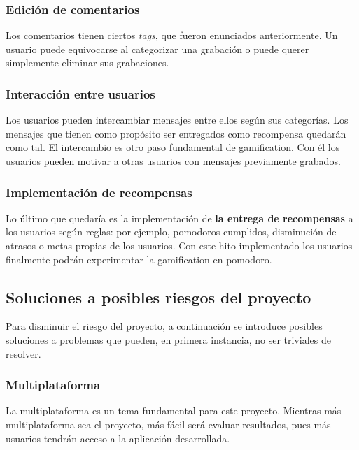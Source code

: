 \documentclass[12pt,letterpaper]{report}
\begin{document}
\subsubsection{Edición de comentarios}

Los comentarios tienen ciertos \emph{tags}, que fueron enunciados anteriormente. Un usuario puede equivocarse al
categorizar una grabación o puede querer simplemente eliminar sus grabaciones.

\subsubsection{Interacción entre usuarios}

Los usuarios pueden intercambiar mensajes entre ellos según sus categorías. Los mensajes que tienen como propósito ser
entregados como recompensa quedarán como tal. El intercambio es otro paso fundamental de gamification. Con él los usuarios
pueden motivar a otras usuarios con mensajes previamente grabados.

\subsubsection{Implementación de recompensas}

Lo último que quedaría es la implementación de \textbf{la entrega de recompensas} a los usuarios según reglas: por
ejemplo, pomodoros cumplidos, disminución de atrasos o metas propias de los usuarios. Con este hito implementado los
usuarios finalmente podrán experimentar la gamification en pomodoro.

\subsection{Soluciones a posibles riesgos del proyecto}

Para disminuir el riesgo del proyecto, a continuación se introduce posibles soluciones a problemas que pueden, en
primera instancia, no ser triviales de resolver.


\subsubsection{Multiplataforma}\label{multiplataforma}

La multiplataforma es un tema fundamental para este proyecto. Mientras más multiplataforma sea el proyecto, más fácil
será evaluar resultados, pues más usuarios tendrán acceso a la aplicación desarrollada.
\end{document}
